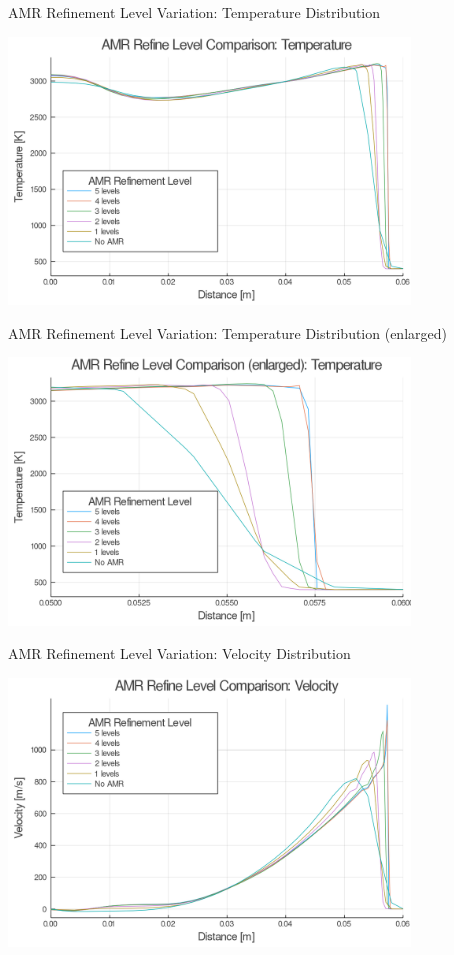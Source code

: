 \begin{frame}{AMR Refinement Level Variation: Temperature Distribution}
\begin{center}
\includegraphics[width=0.8\textwidth]{../figs/amrfigs/amr_refinelevels/t.png}
\end{center}
\end{frame}

\begin{frame}{AMR Refinement Level Variation: Temperature Distribution (enlarged)}
\begin{center}
\includegraphics[width=0.8\textwidth]{../figs/amrfigs/amr_refinelevels/te.png}
\end{center}
\end{frame}

\begin{frame}{AMR Refinement Level Variation: Velocity Distribution}
\begin{center}
\includegraphics[width=0.8\textwidth]{../figs/amrfigs/amr_refinelevels/u.png}
\end{center}
\end{frame}

